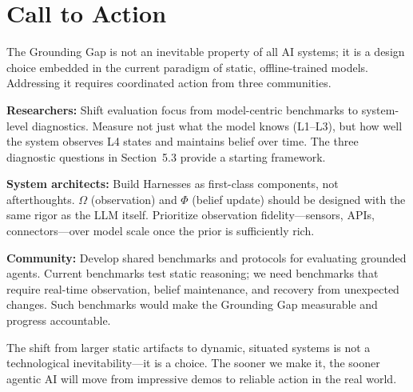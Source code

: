 \section{Call to Action}

The Grounding Gap is not an inevitable property of all AI systems; it is a design choice embedded in the current paradigm of static, offline-trained models. Addressing it requires coordinated action from three communities.

\textbf{Researchers:} Shift evaluation focus from model-centric benchmarks to system-level diagnostics. Measure not just what the model knows (L1--L3), but how well the system observes L4 states and maintains belief over time. The three diagnostic questions in Section~5.3 provide a starting framework.

\textbf{System architects:} Build Harnesses as first-class components, not afterthoughts. \(\Omega\) (observation) and \(\Phi\) (belief update) should be designed with the same rigor as the LLM itself. Prioritize observation fidelity---sensors, APIs, connectors---over model scale once the prior is sufficiently rich.

\textbf{Community:} Develop shared benchmarks and protocols for evaluating grounded agents. Current benchmarks test static reasoning; we need benchmarks that require real-time observation, belief maintenance, and recovery from unexpected changes. Such benchmarks would make the Grounding Gap measurable and progress accountable.

The shift from larger static artifacts to dynamic, situated systems is not a technological inevitability---it is a choice. The sooner we make it, the sooner agentic AI will move from impressive demos to reliable action in the real world.
